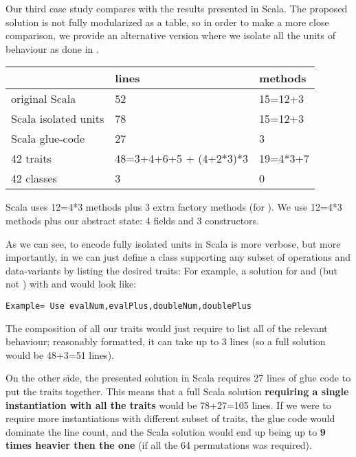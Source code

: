 Our third case study compares with the results presented
in Scala\cite{Zenger-Odersky2005}.
The proposed solution is not fully modularized as a table,
so in order to make a more close comparison, we provide an alternative
version where we isolate all the units of behaviour as done in \name.

\noindent\begin{minipage}{0.65\textwidth}
\begin{tabular}{l |l |l}
&                              lines  &   methods\\
\hline
original Scala          & 52     &  15=12+3\\
Scala  isolated units   & 78    &  15=12+3\\
Scala  glue-code        & 27   &     3\\
42 traits               & 48=3+4+6+5 + (4+2*3)*3   &    19=4*3+7\\
42 classes              &   3    &     0\\
\end{tabular}
\end{minipage}
\begin{minipage}{0.35\textwidth}
Scala uses 12=4*3 methods plus 3 extra factory methods (for \Q@double@).
We use 12=4*3 methods plus our abstract state: 4 fields and 3 constructors.
\end{minipage}

As we can see, to encode fully isolated units in Scala is
more verbose,
but more importantly,
in \name we can just define a class supporting any subset of operations
and data-variants by listing the desired traits:
For example, a solution for \Q@Num@ and \Q@Plus@ (but not \Q@Neg@)
with \Q@eval@ and \Q@double@ would look like:
\begin{lstlisting}
Example= Use evalNum,evalPlus,doubleNum,doublePlus
\end{lstlisting}
The composition of all our traits would just require to list all
of the relevant behaviour; reasonably formatted, it can take up to 3 lines (so a full \name solution would be 48+3=51 lines).

On the other side, the presented solution in Scala requires
27 lines of glue code to put the traits together.
This means that a full Scala solution \textbf{requiring a single instantiation with all the traits} would be 78+27=105 lines.
If we were to require more instantiations with different subset of traits, the glue code would dominate the line count,
and the Scala solution would end up being up to \textbf{9 times heavier then the
\name one} (if all the 64 permutations was required).


